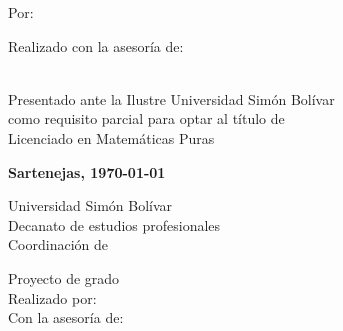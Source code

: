     \vspace{1.5cm}

    \UppercaseBold{
        \wrapto[14cm][\centering]
        {\MainTitle}
    }

    \vspace{1.5cm}

    Por:
    \\
    \autor

    \vspace{1.5cm}

    Realizado con la asesoría de:
    \\
    \tutor

    \vspace{3cm}

    \\
    Presentado ante la Ilustre Universidad Simón Bolívar\\
    como requisito parcial para optar al título de\\
    Licenciado en Matemáticas Puras

    \vspace{\fill}

    \textbf{Sartenejas, \today}\par
\egroup
\fi
\ifresumen\newpage
\pagestyle{plain}
\setcounter{page}{4}
%
\PrintUsbLogo
    {
        Universidad Simón Bolívar\\
        Decanato de estudios profesionales\\
        Coordinación de \coord
    }

\begin{center}
    \begin{minipage}{14cm}
        \centering
        \UppercaseBold
            {
                \MainTitle
            }
    \end{minipage}

    \vspace{.5cm}

    \UpperCase
        {
            Proyecto de grado
        } \\
    Realizado por: \autor \\
    Con la asesoría de: \tutor \\[.5cm]

\end{center}

